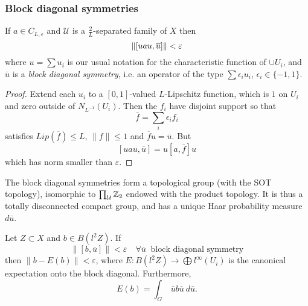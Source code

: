 \subsubsection*{Block diagonal symmetries}

\begin{lem}
If $a \in C_{L,\varepsilon}$ and $\mathcal U $ is a $\frac{2}{L}$-separated family of $X$ then
\[ \| [uau , \overline{u}] \| \\< \varepsilon \]
where $u =\sum u_i$ is our usual notation for the characteristic function of $\cup U_i$, and $\overline u$ is a \textit{block diagonal symmetry}, i.e. an operator of the type $\sum \epsilon_i u_i$, $\epsilon_i\in \{ -1, 1\}$.
\end{lem}

\begin{proof}
Extend each $u_i$ to a $[0,1]$-valued $L$-Lipschitz function, which is $1$ on $U_i$ and zero outside of $N_{L^{-1}}(U_i)$. Then the $f_i$ have disjoint support so that
\[\overline{f}=\sum_i \epsilon_i f_i \]
satisfies $Lip (\overline f )\leq L $, $\| f \| \leq 1$ and $\overline f u =\overline u$. But 
\[[uau , \overline u ] = u [a, \overline f ] u \]   
which has norm smaller than $\varepsilon$.
\end{proof}

The block diagonal symmetries form a topological group (with the SOT topology), isomorphic to $\prod_{\mathcal U} \mathbb Z_2$ endowed with the product topology. It is thus a totally disconnected compact group, and has a unique Haar probability measure $d\overline u$.

\begin{lem}
Let $Z \subset X$ and $b \in B(l^2 Z)$. If \[ \| [b, \overline u ] \| < \varepsilon \quad \forall \overline u \ \text{ block diagonal symmetry} \]
then $\| b - E(b) \| < \varepsilon$, where $E: B(l^2 Z) \rightarrow \bigoplus  l^\infty (U_i)$ is the canonical expectation onto the block diagonal. Furthermore,
\[E(b) = \int_G \ \overline u  b \overline u  \ d\overline u.\]
\end{lem}

